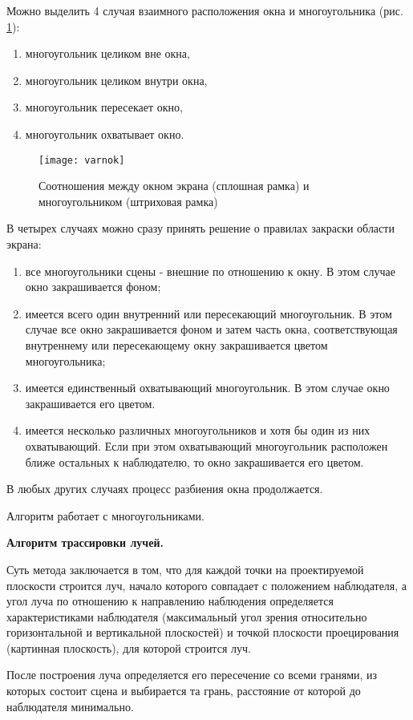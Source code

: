 Можно выделить 4 случая взаимного расположения окна и многоугольника (рис. \ref{img:varnok}):
\begin{enumerate}
	\item многоугольник целиком вне окна,
	\item многоугольник целиком внутри окна,
	\item многоугольник пересекает окно,
	\item многоугольник охватывает окно.
\end{enumerate}

\begin{figure}[H]
	\centering
	\texttt{[image: varnok]}
	\caption{Соотношения между окном экрана (сплошная рамка) и многоугольником (штриховая рамка)}
	\label{img:varnok}
\end{figure}

В четырех случаях можно сразу принять решение о правилах закраски области экрана:
\begin{enumerate}
	\item все многоугольники сцены - внешние по отношению к окну. В этом случае окно закрашивается фоном;
	\item имеется всего один внутренний или пересекающий многоугольник. В этом случае все окно закрашивается фоном и затем часть окна, соответствующая внутреннему или пересекающему окну закрашивается цветом многоугольника;
	\item имеется единственный охватывающий многоугольник. В этом случае окно закрашивается его цветом.
	\item имеется несколько различных многоугольников и хотя бы один из них охватывающий. Если при этом охватывающий многоугольник расположен ближе остальных к наблюдателю, то окно закрашивается его цветом.
\end{enumerate}
В любых других случаях процесс разбиения окна продолжается.

Алгоритм работает с многоугольниками. 

\textbf{Алгоритм трассировки лучей. }

Суть метода заключается в том, что для каждой точки на проектируемой плоскости строится луч, начало которого совпадает с положением наблюдателя, а угол луча по отношению к направлению наблюдения определяется характеристиками наблюдателя (максимальный угол зрения относительно горизонтальной и вертикальной плоскостей) и точкой плоскости проецирования (картинная плоскость), для которой строится луч. 

После построения луча определяется его пересечение со всеми гранями, из которых состоит сцена и выбирается та грань, расстояние от которой до наблюдателя минимально.

